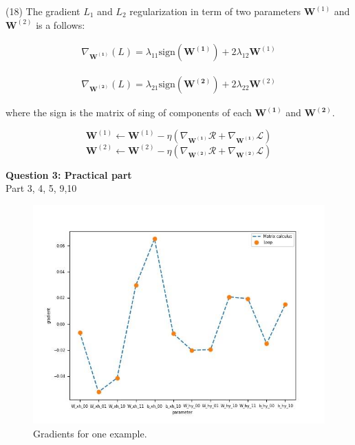 \documentclass[11pt,english]{article}
\newcommand{\sign}{\mathrm{sign}}
\begin{document}
(18)
The gradient $L_1$ and $L_2$ regularization in term of two parameters $\bm{W}^{(1)}$ and $\bm{W}^{(2)}$ is a follows:

\begin{equation}
\begin{split}
\nabla_{\bm{W^{(1)}}}(L)= \lambda_{11}   \sign(\bm{W^{(1)}})+ 2\lambda_{12} {\bm{W}}^{(1)}
\end{split}
\end{equation}

\begin{equation}
\begin{split}
\nabla_{\bm{W^{(2)}}}(L)= \lambda_{21}   \sign(\bm{W^{(2)}})+ 2 \lambda_{22} {\bm{W}}^{(2)}
\end{split}
\end{equation}

where the sign is the matrix of sing of components of each $\bm{W^{(1)}}$ and $\bm{W^{(2)}}$. 

$$
\bm{W}^{(1)} \leftarrow \bm{W}^{(1)}- \eta \left( \nabla_{\bm{W^{(1)}}}\mathcal{R} + \nabla_{\bm{W^{(1)}}}\mathcal{L}\right)
$$
$$
\bm{W}^{(2)} \leftarrow \bm{W}^{(2)}- \eta \left( \nabla_{\bm{W^{(2)}}}\mathcal{R} + \nabla_{\bm{W^{(2)}}}\mathcal{L}\right)
$$


\textbf{Question 3: Practical part}\\
{\noindent\color{red} Part 3,  4, 5, 9,10}
\begin{figure}
	\includegraphics[width=\linewidth]{pic1.jpg}
	\caption{Gradients for one example.}
	\label{fig:boat1}
\end{figure}
\end{document}
